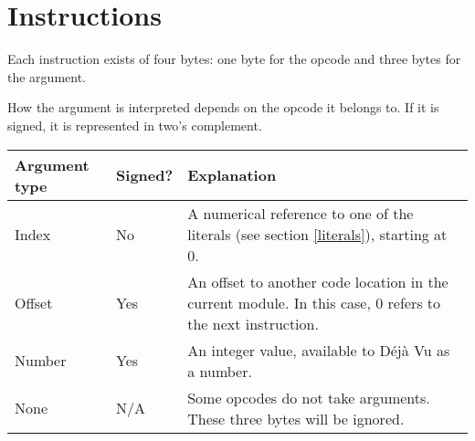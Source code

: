 \section{Instructions}

Each instruction exists of four bytes: one byte for the opcode and three bytes
for the argument.

How the argument is interpreted depends on the opcode it belongs to. If
it is signed, it is represented in two's complement.

\begin{tabular}{|l|l|p{6.5cm}|}
\hline
\bfseries{Argument type} & \bfseries{Signed?} & \bfseries{Explanation} \\ \hline
Index & No & A numerical reference to one of the literals (see section \ref{literals}), starting at 0. \\ \hline
Offset & Yes & An offset to another code location in the current module. In this case, 0 refers to the next instruction. \\ \hline
Number & Yes & An integer value, available to Déjà Vu as a number. \\ \hline
None & N/A & Some opcodes do not take arguments. These three bytes will be ignored. \\ \hline
\end{tabular}

